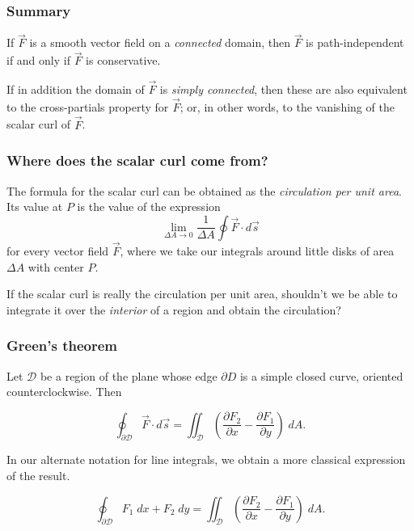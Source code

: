 \documentclass[11pt,ignorenonframetext,aspectratio=169,xcolor={svgnames}]{beamer}
\begin{document}
\begin{frame}\frametitle{Summary}

If $\vec{F}$ is a smooth vector field on a \emph{connected} domain, then
$\vec{F}$ is path-independent if and only if $\vec{F}$ is conservative.

If in addition the domain of $\vec{F}$ is \emph{simply connected}, then
these are also equivalent to the cross-partials property for $\vec{F}$;
or, in other words, to the vanishing of the scalar curl of $\vec{F}$.

\end{frame}

\begin{frame}\frametitle{Where does the scalar curl come from?}

The formula for the scalar curl can be obtained as the \emph{circulation
per unit area}. Its value at $P$ is the value of the expression
\[ \lim_{\Delta A \to 0} \frac{1}{\Delta A} \oint \vec{F} \cdot d\vec{s} \]
for every vector field $\vec{F}$, where we take our integrals around
little disks of area $\Delta A$ with center $P$.

If the scalar curl is really the circulation per unit area, shouldn't we
be able to integrate it over the \emph{interior} of a region and obtain
the circulation?

\end{frame}

\begin{frame}\frametitle{Green's theorem}

Let $\mathcal{D}$ be a region of the plane whose edge $\partial D$ is a
simple closed curve, oriented counterclockwise. Then

\[ \oint_{\mathcal{\partial D}} \vec{F} \cdot d\vec{s} = \iint_{\mathcal{D}} \left( \frac{\partial F_2}{\partial x} - \frac{\partial F_1}{\partial y} \right) \; dA.\]

In our alternate notation for line integrals, we obtain a more classical
expression of the result.

\[ \oint_{\mathcal{\partial D}} F_1 \; dx + F_2 \; dy = \iint_{\mathcal{D}} \left( \frac{\partial F_2}{\partial x} - \frac{\partial F_1}{\partial y} \right) \; dA.\]

\end{frame}
\end{document}
